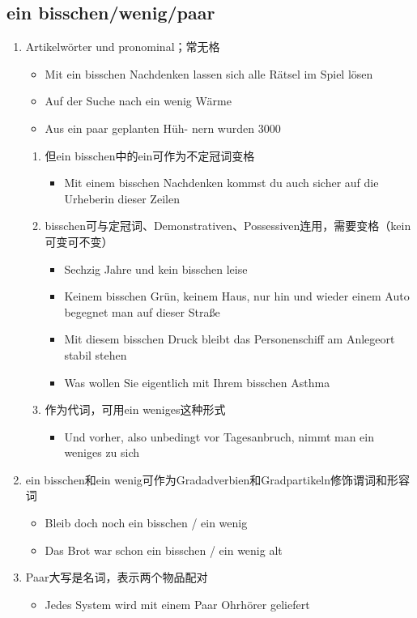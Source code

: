 \documentclass[UTF8]{report}
\begin{document}
\subsection{ein bisschen/wenig/paar}
\begin{enumerate}
    \item Artikelwörter und pronominal；常无格
    \begin{itemize}
        \item Mit ein bisschen Nachdenken lassen sich alle Rätsel im Spiel lösen
        \item Auf der Suche nach ein wenig Wärme
        \item Aus ein paar geplanten Hüh- nern wurden 3000
    \end{itemize}
    \begin{enumerate}
        \item 但ein bisschen中的ein可作为不定冠词变格
        \begin{itemize}
            \item Mit einem bisschen Nachdenken kommst du auch sicher auf die Urheberin dieser Zeilen
        \end{itemize}
        \item bisschen可与定冠词、Demonstrativen、Possessiven连用，需要变格（kein可变可不变）
        \begin{itemize}
            \item Sechzig Jahre und kein bisschen leise
            \item Keinem bisschen Grün, keinem Haus, nur hin und wieder einem Auto begegnet man auf dieser Straße
            \item Mit diesem bisschen Druck bleibt das Personenschiff am Anlegeort stabil stehen
            \item Was wollen Sie eigentlich mit Ihrem bisschen Asthma
        \end{itemize}
        \item 作为代词，可用ein weniges这种形式
        \begin{itemize}
            \item Und vorher, also unbedingt vor Tagesanbruch, nimmt man ein weniges zu sich
        \end{itemize}
    \end{enumerate}
    \item ein bisschen和ein wenig可作为Gradadverbien和Gradpartikeln修饰谓词和形容词
    \begin{itemize}
        \item Bleib doch noch ein bisschen / ein wenig
        \item Das Brot war schon ein bisschen / ein wenig alt
    \end{itemize}
    \item Paar大写是名词，表示两个物品配对
    \begin{itemize}
        \item Jedes System wird mit einem Paar Ohrhörer geliefert
    \end{itemize}
\end{enumerate}
\end{document}
